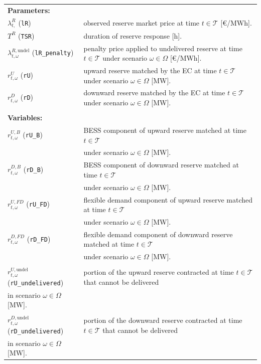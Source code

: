 \documentclass{article}
\begin{document}
\begin{tabularx}{\textwidth}{l l}

\textbf{Parameters:} \\
$\lambda^{R}_{t,}$ (\verb|lR|) & observed reserve market price at time $t \in \mathcal{T}$ [\euro/MWh]. \\
$T^R$ (\verb|TSR|) & duration of reserve response [h]. \\
$\lambda^{R,\text{undel}}_{t,\omega}$ (\verb|lR_penalty|) & penalty price applied to undelivered reserve at time $t \in \mathcal{T}$ under scenario $\omega \in \Omega$ [\euro/MWh]. \\    
$r^{U}_{t, \omega}$ (\verb|rU|) & upward reserve matched by the EC at time $t \in \mathcal{T}$ under scenario $\omega \in \Omega$ [MW]. \\
$r^{D}_{t, \omega}$ (\verb|rD|) & downward reserve matched by the EC at time $t \in \mathcal{T}$ under scenario $\omega \in \Omega$ [MW]. \\
\\
\textbf{Variables:} \\
$r^{U, B}_{t, \omega}$ (\verb|rU_B|) & BESS component of upward reserve matched at time $t \in \mathcal{T}$ \\
& under scenario $\omega \in \Omega$ [MW]. \\
$r^{D, B}_{t, \omega}$ (\verb|rD_B|) & BESS component of downward reserve matched at time $t \in \mathcal{T}$ \\
& under scenario $\omega \in \Omega$ [MW]. \\
$r^{U, FD}_{t, \omega}$ (\verb|rU_FD|) & flexible demand component of upward reserve matched at time $t \in \mathcal{T}$ \\
& under scenario $\omega \in \Omega$ [MW]. \\
$r^{D, FD}_{t, \omega}$ (\verb|rD_FD|) & flexible demand component of downward reserve matched at time $t \in \mathcal{T}$ \\
& under scenario $\omega \in \Omega$ [MW]. \\
\\
$r^{U,\text{undel}}_{t,\omega}$ (\verb|rU_undelivered|) & portion of the upward reserve contracted at time $t\in\mathcal{T}$ that cannot be delivered\\ in scenario $\omega\in\Omega$ [MW]. \\
\\
$r^{D,\text{undel}}_{t,\omega}$ (\verb|rD_undelivered|) & portion of the downward reserve contracted at time $t\in\mathcal{T}$ that cannot be delivered\\ in scenario $\omega\in\Omega$ [MW]. \\

\end{tabularx}\\
\end{document}

